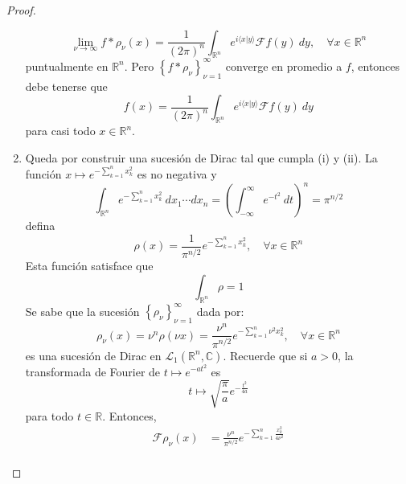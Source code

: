 \documentclass[12pt]{report}
\newcounter{it}
\theoremstyle{largebreak}
\newcommand\pint[2]{\ensuremath{\langle#1| #2\rangle}}
\newcommand{\fou}[1]{\ensuremath{\mathcal{F}#1}}
\begin{document}
\begin{proof}
\begin{enumerate}
\begin{equation*}
                \lim_{ \nu\rightarrow\infty}f*\rho_\nu(x)=\frac{1}{(2\pi)^n}\int_{\mathbb{R}^n}e^{ i\pint{x}{y}}\fou{f}(y)\:dy,\quad\forall x\in\mathbb{R}^n
            \end{equation*}
            puntualmente en $\mathbb{R}^n$. Pero $\left\{f*\rho_\nu \right\}_{\nu=1}^\infty$ converge en promedio a $f$, entonces debe tenerse que
            \begin{equation*}
                f(x)=\frac{1}{(2\pi)^n}\int_{\mathbb{R}^n}e^{ i\pint{x}{y}}\fou{f}(y)\:dy
            \end{equation*}
            para casi todo $x\in\mathbb{R}^n$.
            \item Queda por construir una sucesión de Dirac tal que cumpla (i) y (ii). La función $x\mapsto e^{-\sum_{ k=1}^n x_k^2}$ es no negativa y
            \begin{equation*}
                \int_{\mathbb{R}^n}e^{ -\sum_{ k=1}^n x_k^2}\:dx_1\cdots dx_n=\left(\int_{-\infty}^\infty e^{ -t^2}\:dt\right)^n=\pi^{ n/2}
            \end{equation*}
            defina
            \begin{equation*}
                \rho(x)=\frac{1}{\pi^{ n/2}}e^{-\sum_{ k=1}^n x_k^2},\quad\forall x\in\mathbb{R}^n
            \end{equation*}
            Esta función satisface que
            \begin{equation*}
                \int_{\mathbb{R}^n}\rho=1
            \end{equation*}
            Se sabe que la sucesión $\left\{\rho_\nu\right\}_{\nu=1}^\infty$ dada por:
            \begin{equation*}
                \rho_\nu(x)=\nu^n \rho(\nu x)=\frac{\nu^n}{\pi^{ n/2}}e^{-\sum_{ k=1}^n \nu^2 x_k^2},\quad\forall x\in\mathbb{R}^n
            \end{equation*}
            es una sucesión de Dirac en $\mathcal{L}_1(\mathbb{R}^n,\mathbb{C})$. Recuerde que si $a>0$, la transformada de Fourier de $t\mapsto e^{ -at^2}$ es
            \begin{equation*}
                t\mapsto\sqrt{\frac{\pi}{a}}e^{-\frac{t^2}{4a}}
            \end{equation*}
            para todo $t\in\mathbb{R}$. Entonces,
            \begin{equation*}
                \begin{split}
                    \fou{\rho_\nu}(x)&=\frac{\nu^n}{\pi^{ n/2}}e^{ -\sum_{ k=1}^n \frac{x_k^2}{4\nu^2}}\\

\end{split}
\end{equation*}
\end{enumerate}
\end{proof}
\end{document}
